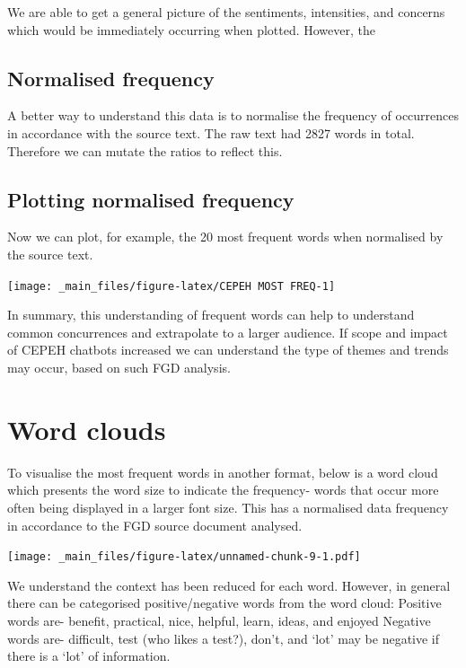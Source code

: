 \documentclass[a4paper, nobind]{templates/ociamthesis}
\begin{document}
We are able to get a general picture of the sentiments, intensities, and
concerns which would be immediately occurring when plotted. However, the

\hypertarget{normalised-frequency}{%
\subsection{Normalised frequency}\label{normalised-frequency}}

A better way to understand this data is to normalise the frequency of
occurrences in accordance with the source text. The raw text had 2827
words in total. Therefore we can mutate the ratios to reflect this.

\hypertarget{plotting-normalised-frequency}{%
\subsection{Plotting normalised frequency}\label{plotting-normalised-frequency}}

Now we can plot, for example, the 20 most frequent words when normalised
by the source text.

\begin{center}\texttt{[image: \_main\_files/figure-latex/CEPEH MOST FREQ-1]} \end{center}

In summary, this understanding of frequent words can help to understand
common concurrences and extrapolate to a larger audience. If scope and
impact of CEPEH chatbots increased we can understand the type of themes
and trends may occur, based on such FGD analysis.

\hypertarget{word-clouds}{%
\section{Word clouds}\label{word-clouds}}

To visualise the most frequent words in another format, below is a word
cloud which presents the word size to indicate the frequency- words that
occur more often being displayed in a larger font size. This has a
normalised data frequency in accordance to the FGD source document
analysed.

\texttt{[image: \_main\_files/figure-latex/unnamed-chunk-9-1.pdf]}

We understand the context has been reduced for each word. However, in
general there can be categorised positive/negative words from the word
cloud: Positive words are- benefit, practical, nice, helpful, learn,
ideas, and enjoyed Negative words are- difficult, test (who likes a
test?), don't, and `lot' may be negative if there is a `lot' of
information.
\end{document}
